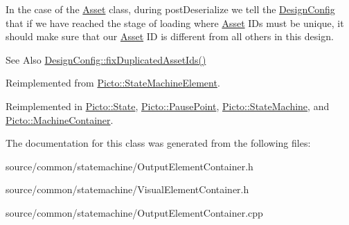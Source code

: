 In the case of the \hyperlink{class_picto_1_1_asset}{Asset} class, during post\-Deserialize we tell the \hyperlink{class_picto_1_1_design_config}{Design\-Config} that if we have reached the stage of loading where \hyperlink{class_picto_1_1_asset}{Asset} I\-Ds must be unique, it should make sure that our \hyperlink{class_picto_1_1_asset}{Asset} I\-D is different from all others in this design. \begin{DoxySeeAlso}{See Also}
\hyperlink{class_picto_1_1_design_config_ab57e0738b97e4358ab09530cd6815fc0}{Design\-Config\-::fix\-Duplicated\-Asset\-Ids()} 
\end{DoxySeeAlso}


Reimplemented from \hyperlink{class_picto_1_1_state_machine_element_ac71e3f57e16c8be8dc4d6900c836948f}{Picto\-::\-State\-Machine\-Element}.



Reimplemented in \hyperlink{class_picto_1_1_state_a8e789d2395df4d047a278f3c09716468}{Picto\-::\-State}, \hyperlink{class_picto_1_1_pause_point_ad0934a59b009d24126005cab68edb641}{Picto\-::\-Pause\-Point}, \hyperlink{class_picto_1_1_state_machine_a3b28ab6e5310ea16c2dbb19d6e071f80}{Picto\-::\-State\-Machine}, and \hyperlink{class_picto_1_1_machine_container_a36591811c50d2086866100c246d751d0}{Picto\-::\-Machine\-Container}.



The documentation for this class was generated from the following files\-:\begin{DoxyCompactItemize}
\item 
source/common/statemachine/Output\-Element\-Container.\-h\item 
source/common/statemachine/Visual\-Element\-Container.\-h\item 
source/common/statemachine/Output\-Element\-Container.\-cpp\end{DoxyCompactItemize}
